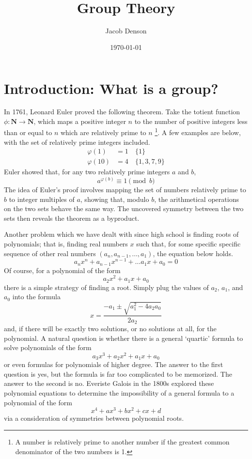 \documentclass[12pt]{amsbook}
\title{Group Theory}
\author{Jacob Denson}
\date{\today}
\theoremstyle{plain}
\theoremstyle{definition}
\begin{document}
\maketitle

\tableofcontents

\chapter{Introduction: What is a group?}

In 1761, Leonard Euler proved the following theorem. Take the totient function $\phi:\mathbf{N} \to \mathbf{N}$, which maps a positive integer $n$ to the number of positive integers less than or equal to $n$ which are relatively prime to $n$ \footnote{A number is relatively prime to another number if the greatest common denominator of the two numbers is 1.}. A few examples are below, with the set of relatively prime integers included.
%
\begin{align*}
    \varphi(1) &= 1\ &\{1\}\\
    \varphi(10) &= 4\ &\{1,3,7,9\}
\end{align*}
%
Euler showed that, for any two relatively prime integers $a$ and $b$,
%
\[ a^{\varphi(b)} \equiv 1 \pmod{b} \]
%
The idea of Euler's proof involves mapping the set of numbers relatively prime to $b$ to integer multiples of $a$, showing that, modulo $b$, the arithmetical operations on the two sets behave the same way. The uncovered symmetry between the two sets then reveals the theorem as a byproduct.

Another problem which we have dealt with since high school is finding roots of polynomials; that is, finding real numbers $x$ such that, for some specific specific sequence of other real numbers $(a_n,a_{n-1},\dots,a_1)$, the equation below holds.
%
\[ a_nx^n + a_{n-1}x^{n-1} + \dots a_1x + a_0 = 0 \]
%
Of course, for a polynomial of the form
%
\[ a_2x^2 + a_1x + a_0 \]
%
there is a simple strategy of finding a root. Simply plug the values of $a_2$, $a_1$, and $a_0$ into the formula
%
\[ x = \frac{-a_1 \pm \sqrt{a_1^2 - 4a_2a_0}}{2a_2} \]
%
and, if there will be exactly two solutions, or no solutions at all, for the polynomial. A natural question is whether there is a general `quartic' formula to solve polynomials of the form
%
\[ a_3x^3 + a_2x^2 + a_1x + a_0 \]
%
or even formulas for polynomials of higher degree. The answer to the first question is yes, but the formula is far too complicated to be memorized. The answer to the second is no. Everiste Galois in the 1800s explored these polynomial equations to determine the impossibility of a general formula to a polynomial of the form
%
\[ x^4 + ax^3 + bx^2 + cx + d \]
%
via a consideration of symmetries between polynomial roots.
\end{document}
